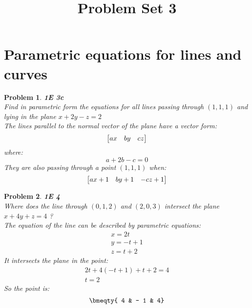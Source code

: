 \documentclass[11pt]{article}
\begin{document}
    \title{Problem Set 3}
    \maketitle

    \newtheorem{theorem}{Theorem}
    \newtheorem{definition}{Definition}
    \newtheorem{example}{Example}
    \newtheorem{problem}{Problem}

    \section{Parametric equations for lines and curves}

    \begin{problem}
        \textbf{1E 3c}\\
        Find in parametric form the equations for all lines passing through $(1, 1, 1)$ and lying in the plane $x + 2y - z = 2$\\
        The lines parallel to the normal vector of the plane have a vector form:
        \[\bmqty{ax & by & cz}\]
        where:
        \[a + 2b - c =0\]
        They are also passing through a point $(1, 1, 1)$ when:
        \[\bmqty{ax+1 & by +1 & -cz +1}\]
    \end{problem}

    \begin{problem}
        \textbf{1E 4}\\
        Where does the line through $( 0,1,2 )$ and $( 2,0,3 )$ intersect the plane $x + 4 y + z = 4$ ?\\
        The equation of the line can be described by parametric equations:\\
        \begin{gather*}
            x = 2t\\
            y = -t + 1\\
            z = t + 2
        \end{gather*}
        It intersects the plane in the point:\\
        \begin{gather*}
            2t + 4(-t + 1) + t + 2 = 4\\
            t = 2
        \end{gather*}
        So the point is:
        \begin{gather*}
            \bmeqty{ 4 & - 1 & 4}
        \end{gather*}
    \end{problem}
\end{document}
